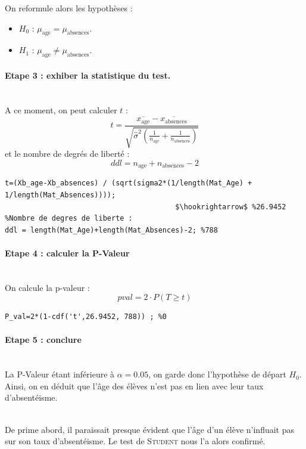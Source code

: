 \documentclass[11pt]{article}
\begin{document}
On reformule alors les hypothèses : 
\begin{itemize}
\item[\textbullet] $H_0$ : $\mu_{\text{age}} = \mu_{\text{absences}}$.
\item[\textbullet] $H_1$ : $\mu_{\text{age}}\neq \mu_{\text{absences}}$.
\end{itemize}

\paragraph{Etape 3 : exhiber la statistique du test.}~\\\indent
A ce moment, on peut calculer $t$ :
$$ t = \frac{\overline{x_{\text{age}}} - \overline{x_{\text{absences}}}}{\sqrt{\widehat{\sigma}^2 \left(\frac{1}{n_{\text{age}}} + \frac{1}{n_{\text{absences}}}\right)}}$$
et le nombre de degrés de liberté :
$$ ddl = n_{\text{age}}+n_{\text{absences}} -2$$ 

\begin{lstlisting}[firstnumber=39, mathescape,caption={Calcul de $t$ et du nombre de degrés de liberté pour le test de \textsc{Student}}]
t=(Xb_age-Xb_absences) / (sqrt(sigma2*(1/length(Mat_Age) + 1/length(Mat_Absences)))); 
										$\hookrightarrow$ %26.9452 
%Nombre de degres de liberte : 
ddl = length(Mat_Age)+length(Mat_Absences)-2; %788
\end{lstlisting}

\paragraph{Etape 4 : calculer la P-Valeur}~\\\indent
On calcule la p-valeur : 
$$pval = 2\cdot P(T\geq t)$$

\begin{lstlisting}[firstnumber=45,caption={Calcul de la P-Valeur pour le test de \textsc{Student}}]
P_val=2*(1-cdf('t',26.9452, 788)) ; %0
\end{lstlisting}

\paragraph{Etape 5 : conclure}~\\\indent
La P-Valeur étant inférieure à $\alpha = 0.05$, on garde donc l'hypothèse de départ $H_0$. Ainsi, on en déduit que l'âge des élèves n'est pas en lien avec leur taux d'absentéisme.

~\\ De prime abord, il paraissait presque évident que l'âge d'un élève n'influait pas sur son taux d'absentéisme. Le test de \textsc{Student} nous l'a alors confirmé. 
\end{document}
